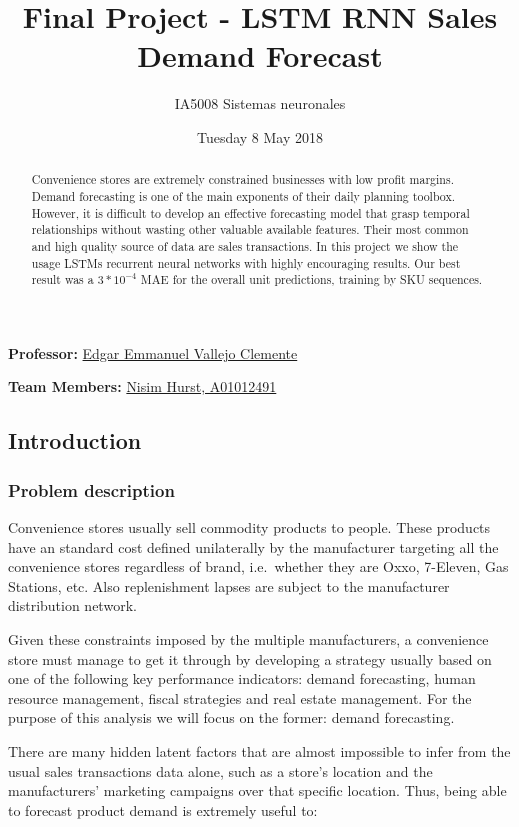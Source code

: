 \documentclass[]{article}
\title{Final Project - LSTM RNN Sales Demand Forecast}
\subtitle{IA5008 Sistemas neuronales}
\author{}
\date{Tuesday 8 May 2018}
\theoremstyle{definition}
\theoremstyle{definition}
\theoremstyle{definition}
\theoremstyle{remark}
\begin{document}
\maketitle
\begin{abstract}
Convenience stores are extremely constrained businesses with low profit
margins. Demand forecasting is one of the main exponents of their daily
planning toolbox. However, it is difficult to develop an effective
forecasting model that grasp temporal relationships without wasting
other valuable available features. Their most common and high quality
source of data are sales transactions. In this project we show the usage
LSTMs recurrent neural networks with highly encouraging results. Our
best result was a \(3*10^{-4}\) MAE for the overall unit predictions,
training by SKU sequences.
\end{abstract}

\textbf{Professor:} \href{mailto:vallejo@itesm.mx}{Edgar Emmanuel
Vallejo Clemente}

\textbf{Team Members:} \href{mailto:A01012491@itesm.mx}{Nisim Hurst,
A01012491}

\subsection{Introduction}\label{introduction}

\subsubsection{Problem description}\label{problem-description}

Convenience stores usually sell commodity products to people. These
products have an standard cost defined unilaterally by the manufacturer
targeting all the convenience stores regardless of brand, i.e.~whether
they are Oxxo, 7-Eleven, Gas Stations, etc. Also replenishment lapses
are subject to the manufacturer distribution network.

Given these constraints imposed by the multiple manufacturers, a
convenience store must manage to get it through by developing a strategy
usually based on one of the following key performance indicators: demand
forecasting, human resource management, fiscal strategies and real
estate management. For the purpose of this analysis we will focus on the
former: demand forecasting.

There are many hidden latent factors that are almost impossible to infer
from the usual sales transactions data alone, such as a store's location
and the manufacturers' marketing campaigns over that specific location.
Thus, being able to forecast product demand is extremely useful to:
\end{document}
